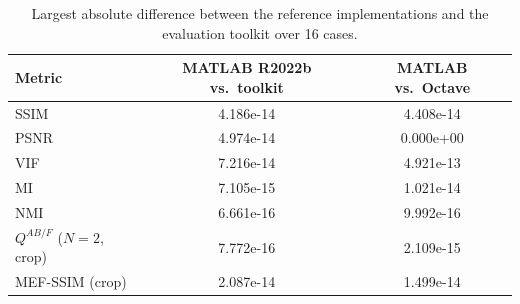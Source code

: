 \begin{table}[htbp]
\centering\small
\caption{Largest absolute difference between the reference implementations and the evaluation toolkit over 16 cases.}
\label{tab:xval}
\begin{tabular}{lcc}
\toprule
Metric & MATLAB R2022b vs.\ toolkit & MATLAB vs.\ Octave \\
\midrule
SSIM & 4.186e-14 & 4.408e-14 \\
PSNR & 4.974e-14 & 0.000e+00 \\
VIF & 7.216e-14 & 4.921e-13 \\
MI & 7.105e-15 & 1.021e-14 \\
NMI & 6.661e-16 & 9.992e-16 \\
$Q^{AB/F}$ ($N=2$, crop) & 7.772e-16 & 2.109e-15 \\
MEF-SSIM (crop) & 2.087e-14 & 1.499e-14 \\
\bottomrule
\end{tabular}
\end{table}
